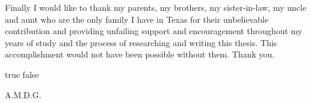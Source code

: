 Finally I would like to thank my parents, my brothers, my sister-in-law, my uncle and aunt who are the only family I have in Texas for their unbelievable contribution and providing unfailing support and encouragement throughout my years of study and the process of researching and writing this thesis. This accomplishment would not have been possible without them. Thank you. 

\pagebreak{}

\ifx true false
\vspace*{\fill}
\begin{center}
A.M.D.G.
\end{center}
\vspace*{\fill}
\pagebreak{}
\fi
